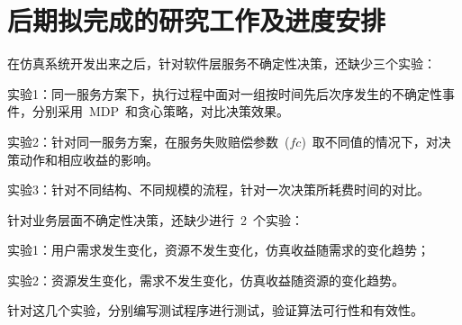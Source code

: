 \section{后期拟完成的研究工作及进度安排}

在仿真系统开发出来之后，针对软件层服务不确定性决策，还缺少三个实验：

实验1：同一服务方案下，执行过程中面对一组按时间先后次序发生的不确定性事件，分别采用~MDP~和贪心策略，对比决策效果。

实验2：针对同一服务方案，在服务失败赔偿参数~($fc$)~取不同值的情况下，对决策动作和相应收益的影响。

实验3：针对不同结构、不同规模的流程，针对一次决策所耗费时间的对比。

针对业务层面不确定性决策，还缺少进行~2~个实验：

实验1：用户需求发生变化，资源不发生变化，仿真收益随需求的变化趋势；

实验2：资源发生变化，需求不发生变化，仿真收益随资源的变化趋势。

针对这几个实验，分别编写测试程序进行测试，验证算法可行性和有效性。